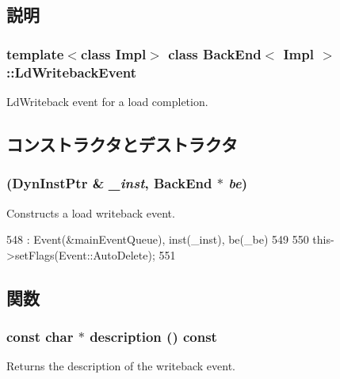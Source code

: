 \subsection{説明}
\subsubsection*{template$<$class Impl$>$ class BackEnd$<$ Impl $>$::LdWritebackEvent}

LdWriteback event for a load completion. 

\subsection{コンストラクタとデストラクタ}
\hypertarget{classBackEnd_1_1LdWritebackEvent_acb4a3159b31096e59f3c05256151e7e0}{
\subsubsection[{LdWritebackEvent}]{ ({\bf DynInstPtr} \& {\em \_\-inst}, \/  {\bf BackEnd} $\ast$ {\em be})}}
\label{classBackEnd_1_1LdWritebackEvent_acb4a3159b31096e59f3c05256151e7e0}
Constructs a load writeback event. 


\begin{DoxyCode}
548     : Event(&mainEventQueue), inst(_inst), be(_be)
549 {
550     this->setFlags(Event::AutoDelete);
551 }
\end{DoxyCode}


\subsection{関数}
\hypertarget{classBackEnd_1_1LdWritebackEvent_a5a14fe478e2393ff51f02e9b7be27e00}{
\subsubsection[{description}]{\setlength{\rightskip}{0pt plus 5cm}const char $\ast$ description () const}}
\label{classBackEnd_1_1LdWritebackEvent_a5a14fe478e2393ff51f02e9b7be27e00}
Returns the description of the writeback event. 

